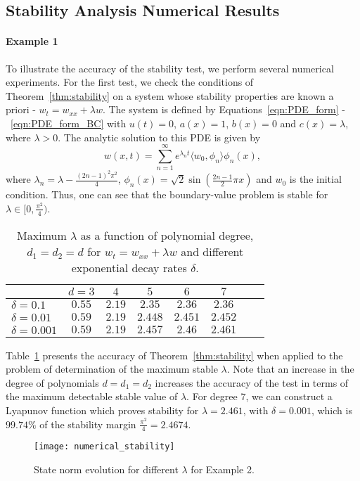 \documentclass[9pt,journal,twocolumn]{IEEEtran}
\begin{document}
 \subsection{Stability Analysis Numerical Results}\label{stabannum}

\paragraph*{Example 1} To illustrate the accuracy of the stability test, we perform several numerical experiments. For the first test, we check the conditions of Theorem~\ref{thm:stability} on a system whose stability properties are known a priori - $w_t= w_{xx}+\lambda w$. The system is defined by Equations~\eqref{eqn:PDE_form} -~\eqref{eqn:PDE_form_BC} with $u(t)=0$, $a(x)=1$, $b(x)=0$ and $c(x)=\lambda$, where $\lambda > 0$. The analytic solution to this PDE is given by
\[w(x,t)=\sum_{n=1}^\infty e^{\lambda_n t}\langle w_0, \phi_n \rangle \phi_n(x) , \] where $\lambda_n = \lambda - \frac{(2n-1)^2 \pi^2}{4}$, $\phi_n(x)=\sqrt{2} \sin \left( \frac{2n-1}{2} \pi x\right)$ and $w_0$ is the initial condition. Thus, one can see that the boundary-value problem is stable for $\lambda \in [0, \frac{\pi^2}{4})$.
\begin{table}{}
\begin{center}
    \begin{tabular}{l *{7}{c}}\hline \hline
 & $d=3$ & $4$ & $5$ & $6$ & $7$ \\ \hline
$\delta=0.1$ &  $0.55$ & $2.19$ & $2.35$ & $2.36$ & $2.36$ \\
$\delta=0.01$ & $0.59$ & $2.19$ & $2.448$ & $2.451$ & $2.452$ \\
$\delta=0.001$ & $0.59$ & $2.19$ & $2.457$ & $2.46$ & $2.461$
\end{tabular}
\end{center}
\caption{Maximum $\lambda$ as a function of polynomial degree, $d_1=d_2=d$ for $w_t= w_{xx}+\lambda w$ and different exponential decay rates $\delta$.}
\label{table_analysis}
\end{table}
 Table~\ref{table_analysis} presents the accuracy of Theorem~\ref{thm:stability} when applied to the problem of determination of the maximum stable $\lambda$. Note that an increase in the degree of polynomials $d=d_1=d_2$ increases the accuracy of the test in terms of the maximum detectable stable value of $\lambda$. For degree $7$, we can construct a Lyapunov function which proves stability for $\lambda=2.461$, with $\delta=0.001$, which is $99.74 \%$ of the stability margin $\frac{\pi^2}{4}=2.4674$.
\begin{figure}[ht]
\centering
\texttt{[image: numerical\_stability]}
\caption{State norm evolution for different $\lambda$ for Example 2.}
\label{fig:num_stability}
\end{figure}
\end{document}
